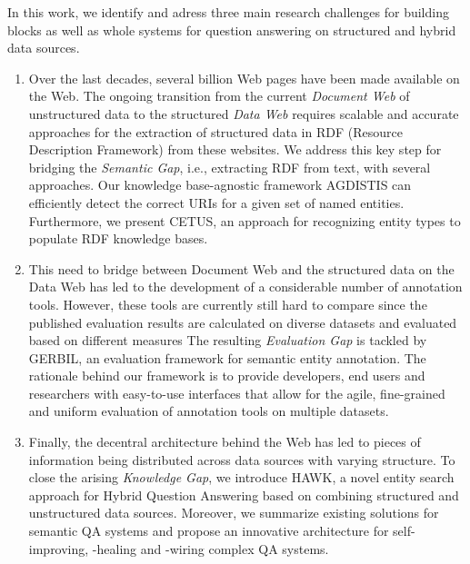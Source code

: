 In this work, we identify and adress three main research challenges for building blocks as well as whole systems for question answering on structured and hybrid data sources.
\begin{enumerate}
\item 
Over the last decades, several billion Web pages have been made available on the Web. 
The ongoing transition from the current \emph{Document Web} of unstructured data to the structured \emph{Data Web} requires scalable and accurate approaches for the extraction of structured data in RDF (Resource Description Framework) from these websites.
We address this key step for bridging the \emph{Semantic Gap}, i.e., extracting RDF from text,  with several approaches.
Our knowledge base-agnostic framework AGDISTIS can efficiently detect the correct URIs for a given set of named entities.
Furthermore, we present CETUS, an approach for recognizing entity types to populate RDF knowledge bases. 
\item 
This need to bridge between Document Web and the structured data on the Data Web has led to the development of a considerable number of annotation tools. However, these tools are currently still hard to compare since the published evaluation results are calculated on diverse datasets and evaluated based on different measures
The resulting \emph{Evaluation Gap} is tackled by GERBIL, an evaluation framework for semantic entity annotation. The rationale behind our framework is to provide developers, end users and researchers with easy-to-use interfaces that allow for the agile, fine-grained and uniform evaluation of annotation tools on multiple datasets.
\item 
Finally, the decentral architecture behind the Web has led to pieces of information being distributed across data sources with varying structure. 
To close the arising \emph{Knowledge Gap}, we introduce HAWK, a novel entity search approach for Hybrid Question Answering based on combining structured and unstructured data sources.
Moreover, we summarize existing solutions for semantic QA systems and propose an innovative architecture for self-improving, -healing and -wiring complex QA systems.
\end{enumerate}
%
